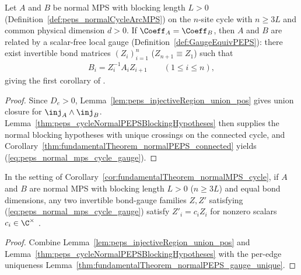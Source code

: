 \begin{corollary}%
    \label{cor:fundamentalTheorem_normalMPS_cycle}
    \leanok
    Let $A$ and $B$ be normal MPS with blocking length $L>0$
    (Definition~\ref{def:peps_normalCycleArcMPS}) on the $n$-site cycle with
    $n\ge 3L$ and common physical dimension $d>0$. If $\Coeff_A=\Coeff_B$, then
    $A$ and $B$ are related by a scalar-free local gauge
    (Definition~\ref{def:GaugeEquivPEPS}): there exist invertible bond matrices
    $(Z_i)_{i=1}^n$ ($Z_{n+1}\equiv Z_1$) such that
    \begin{align}
        B_i = Z_i^{-1} A_i Z_{i+1}
        \qquad (1\le i\le n),
        \label{eq:peps_normal_mps_cycle_gauge}
    \end{align}
    giving the first corollary of \cite[Section~4]{Molnar2018NormalPEPS}.
\end{corollary}
\begin{proof}\leanok
    Since $D_e>0$, Lemma~\ref{lem:peps_injectiveRegion_union_pos} gives union
    closure for $\inj_A\wedge\inj_B$.
    Lemma~\ref{thm:peps_cycleNormalPEPSBlockingHypotheses} then supplies the
    normal blocking hypotheses with unique crossings on the connected cycle, and
    Corollary~\ref{thm:fundamentalTheorem_normalPEPS_connected} yields
    (\ref{eq:peps_normal_mps_cycle_gauge}).
\end{proof}

\begin{corollary}%
    \label{cor:fundamentalTheorem_normalMPS_cycle_gauge_unique}
    \leanok
    In the setting of Corollary~\ref{cor:fundamentalTheorem_normalMPS_cycle}, if
    $A$ and $B$ are normal MPS with blocking length $L>0$ ($n\ge 3L$) and equal
    bond dimensions, any two invertible bond-gauge families $Z,Z'$ satisfying
    (\ref{eq:peps_normal_mps_cycle_gauge}) satisfy $Z'_i=c_i Z_i$ for nonzero
    scalars $c_i\in\C^\times$ \cite[Section~4]{Molnar2018NormalPEPS}.
\end{corollary}
\begin{proof}\leanok
    Combine Lemma~\ref{lem:peps_injectiveRegion_union_pos} and
    Lemma~\ref{thm:peps_cycleNormalPEPSBlockingHypotheses} with the per-edge
    uniqueness Lemma~\ref{thm:fundamentalTheorem_normalPEPS_gauge_unique}.
\end{proof}

